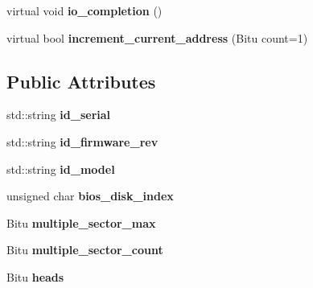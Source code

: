 \begin{DoxyCompactItemize}
\item 
\hypertarget{classIDEATADevice_a32967272c300dddcecf5e1bdeb96d739}{virtual void {\bfseries io\-\_\-completion} ()}\label{classIDEATADevice_a32967272c300dddcecf5e1bdeb96d739}

\item 
\hypertarget{classIDEATADevice_a09a7ab04eb358de7a1b1028bf42b1001}{virtual bool {\bfseries increment\-\_\-current\-\_\-address} (Bitu count=1)}\label{classIDEATADevice_a09a7ab04eb358de7a1b1028bf42b1001}

\end{DoxyCompactItemize}
\subsection*{Public Attributes}
\begin{DoxyCompactItemize}
\item 
\hypertarget{classIDEATADevice_a76139ad92fd559d38b75ff2e22ad5d5e}{std\-::string {\bfseries id\-\_\-serial}}\label{classIDEATADevice_a76139ad92fd559d38b75ff2e22ad5d5e}

\item 
\hypertarget{classIDEATADevice_a209f60a9af47898a7fcb17340ca1991b}{std\-::string {\bfseries id\-\_\-firmware\-\_\-rev}}\label{classIDEATADevice_a209f60a9af47898a7fcb17340ca1991b}

\item 
\hypertarget{classIDEATADevice_ac9be6883d9b4bc55a9d48c9f137a8e9f}{std\-::string {\bfseries id\-\_\-model}}\label{classIDEATADevice_ac9be6883d9b4bc55a9d48c9f137a8e9f}

\item 
\hypertarget{classIDEATADevice_aa23a2040e556f5c98cab8e84db39c1f1}{unsigned char {\bfseries bios\-\_\-disk\-\_\-index}}\label{classIDEATADevice_aa23a2040e556f5c98cab8e84db39c1f1}

\item 
\hypertarget{classIDEATADevice_a480bc444ca209552f9e0d443d194c3fe}{Bitu {\bfseries multiple\-\_\-sector\-\_\-max}}\label{classIDEATADevice_a480bc444ca209552f9e0d443d194c3fe}

\item 
\hypertarget{classIDEATADevice_ac20e7089458483abe506f76d2dc75cd8}{Bitu {\bfseries multiple\-\_\-sector\-\_\-count}}\label{classIDEATADevice_ac20e7089458483abe506f76d2dc75cd8}

\item 
\hypertarget{classIDEATADevice_a6fb1883b12c1451c09b83ae1c855057f}{Bitu {\bfseries heads}}\label{classIDEATADevice_a6fb1883b12c1451c09b83ae1c855057f}


\end{DoxyCompactItemize}
